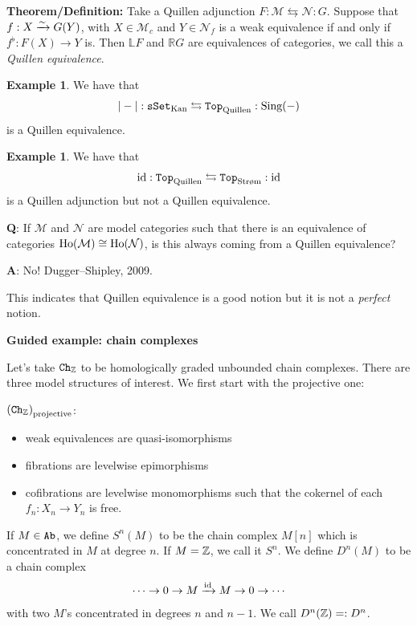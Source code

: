 \documentclass[12pt]{amsart}
\theoremstyle{definition}
\newtheorem{example}[theorem]{Example}
\begin{document}
\textbf{Theorem/Definition:} Take a Quillen adjunction $F: \mathcal{M} \leftrightarrows \mathcal{N}: G$. Suppose that $f: X \xrightarrow{\sim} G(Y)$, with $X\in \mathcal{M}_c$ and $Y\in \mathcal{N}_f$ is a weak equivalence if and only if $f^\flat:F(X) \to Y$ is. Then $\mathbb{L}F$ and $\mathbb{R}G$ are equivalences of categories, we call this a \textit{Quillen equivalence}.

\begin{example} We have that
\begin{align*}
    |-|:\texttt{sSet}_\text{Kan} \leftrightarrows \texttt{Top}_\text{Quillen}: \text{Sing}(-)
\end{align*}
is a Quillen equivalence.
\end{example}

\begin{example} We have that
\begin{align*}
    \id: \Top_\text{Quillen} \leftrightarrows \Top_\text{Str{\o}m}:\id
\end{align*}
is a Quillen adjunction but not a Quillen equivalence.
\end{example}

\textbf{Q}: If $\mathcal{M}$ and $\mathcal{N}$ are model categories such that there is an equivalence of categories $\text{Ho}(\mathcal{M}) \cong \text{Ho}(\mathcal{N})$, is this always coming from a Quillen equivalence?

\textbf{A}: No! Dugger--Shipley, 2009.

This indicates that Quillen equivalence is a good notion but it is not a \textit{perfect} notion.

\begin{center}
    \textbf{Guided example: chain complexes}
\end{center}

Let's take $\texttt{Ch}_{\mathbb{Z}}$ to be homologically graded unbounded chain complexes. There are three model structures of interest. We first start with the projective one:

$\left( \texttt{Ch}_{\mathbb{Z}} \right)_\text{projective}$:
\begin{itemize}
    \item weak equivalences are quasi-isomorphisms
    \item fibrations are levelwise epimorphisms
    \item cofibrations are levelwise monomorphisms such that the cokernel of each $f_n:X_n \to Y_n$ is free.
\end{itemize}

If $M \in \texttt{Ab}$, we define $S^n(M)$ to be the chain complex $M[n]$ which is concentrated in $M$ at degree $n$. If $M=\mathbb{Z}$, we call it $S^n$. We define $D^n(M)$ to be a chain complex
\begin{align*}
    \cdots \to 0 \to M \xrightarrow{\text{id}} M \to 0\to \cdots
\end{align*}
with two $M$'s concentrated in degrees $n$ and $n-1$. We call $D^n(\mathbb{Z})=:D^n$.
\end{document}
